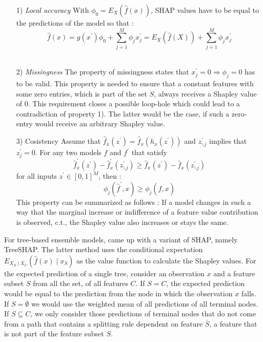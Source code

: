 \documentclass[12pt,a4paper]{article}
\begin{document}
\begin{itemize}
\item[1)] \textit{Local accuracy} 
With $\phi_{0}=E_{X}(\hat{f}(x))$, SHAP values have to be equal to the predictions of the model so that :
\begin{equation}
\hat{f}(x)=g(x^\prime)\phi_{0}+\sum_{j=1}^{M} \phi_{j} x_{j}^{\prime}=E_{X}(\hat{f}(X))+\sum_{j=1}^{M} \phi_{j}x_{j}^{\prime}
\end{equation} \\
\item[2)] \textit{Missingness} 
The property of missingness states that $x_{j}^{\prime}=0 \Rightarrow \phi_{j}=0$ has to be valid. This property is needed to ensure that a constant features with some zero entries, which is part of the set $S$, always receives a Shapley value of $0$. This requirement closes a possible loop-hole which could lead to a contradiction of property 1). The latter would be the case, if such a zero-entry would receive an arbitrary Shapley value.  \\
\item [3)] Cosistency 
Assume that $\hat{f}_x(z^{\prime})=\hat{f}_x(h_x(z^{\prime})) $ and $z^{\prime}_{\backslash j}$ implies that $z_j^{\prime}=0$. For any two models $f$ and $f^\prime$ that satisfy 
\begin{equation}
\hat{f}_{x}^{\prime}\left(z^{\prime}\right)-\hat{f}_{x}^{\prime}\left(z_{\backslash j}^{\prime}\right) \geq \hat{f}_{x}\left(z^{\prime}\right)-\hat{f}_{x}\left(z_{\backslash j}^{\prime}\right)
\end{equation}
for all inputs $z^\prime \in [0,1]^M$, then : 
\begin{equation}
\phi_{j}\left(\hat{f}^{\prime}, x\right) \geq \phi_{j}(\hat{f}, x)
\end{equation}
This property can be summarized as follows : If a model changes in such a way that the marginal increase or indifference of a feature value contribution is observed, c.t., the Shapley value also increases or stays the same. 
\end{itemize}

For tree-based ensemble models, \textcite{Lundberg2018} came up with a variant of SHAP, namely TreeSHAP. The latter method uses the conditional expectation \(E_{X_{S} \mid X_{C}}\left(\hat{f}(x) \mid x_{S}\right)\) as the value function to calculate the Shapley values. For the expected prediction of a single tree, consider an observation \(x\) and a feature subset \(S\) from all the set, of all features \(C\). If \(S=C\), the expected prediction would be equal to the prediction from the node in which the observation \(x\) falls. If \(S=\emptyset\) we would use the weighted mean of all predictions of all terminal nodes. If \(S \subseteq C\), we only consider those predictions of terminal nodes that do not come from a path that contains a splitting rule dependent on feature \(\overline{S}\), a feature that is not part of the feature subset \(S\).
\end{document}
